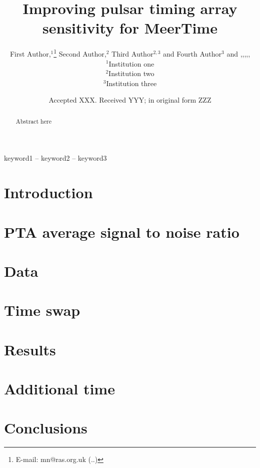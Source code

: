 \documentclass[fleqn,usenatbib]{mnras}
\title[Short title, max. 45 characters]{Improving pulsar timing array sensitivity for MeerTime}
\author[First Author et al.]{
First Author,$^{1}$\thanks{E-mail: mn@ras.org.uk (..)}
Second Author,$^{2}$
Third Author$^{2,3}$
and Fourth Author$^{3}$
and ,,,,,
\\
$^{1}$Institution one\\
$^{2}$Institution two\\
$^{3}$Institution three
}
\date{Accepted XXX. Received YYY; in original form ZZZ}
\begin{document}
\label{firstpage}
\pagerange{\pageref{firstpage}--\pageref{lastpage}}
\maketitle

\begin{abstract}
Abstract here
\end{abstract}

\begin{keywords}
keyword1 -- keyword2 -- keyword3
\end{keywords}



\section{Introduction}
\label{sec:introduction}


\section{PTA average signal to noise ratio}
\label{sec:snr}



\section{Data}
\label{sec:data}



\section{Time swap}
\label{sec:timeshuffle}



\section{Results}
\label{sec:results}


\section{Additional time}
\label{sec:twentyPercent}



\section{Conclusions}
\label{sec:conclusions}

\end{document}
